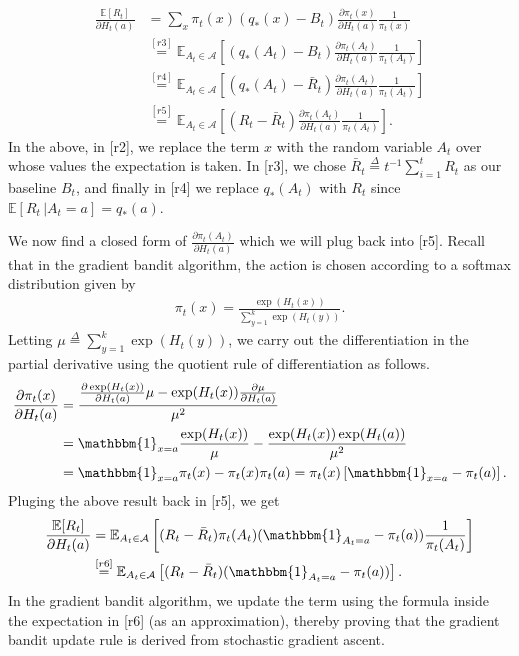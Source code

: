 \documentclass[10pt]{article}
\newcommand{\ldef}{\stackrel{\Delta}{=}}
\begin{document}
	\begin{align*}
	\frac{\mathbb{E}[R_t]}{\partial H_t(a)} &= \sum_{x} \pi_t(x) (q_{*}(x) - B_t) \frac{\partial \pi_t(x)}{\partial H_t(a)}\frac{1}{\pi_t(x)}\\
	& \stackrel{[r3]}{=} \mathbb{E}_{A_t\in\mathcal{A}}\left[ (q_{*}(A_t) - B_t) \frac{\partial \pi_t(A_t)}{\partial H_t(a)}\frac{1}{\pi_t(A_t)} \right]\\
	& \stackrel{[r4]}{=} \mathbb{E}_{A_t\in\mathcal{A}}\left[ (q_{*}(A_t) - \bar{R}_t) \frac{\partial \pi_t(A_t)}{\partial H_t(a)}\frac{1}{\pi_t(A_t)} \right]\\
	& \stackrel{[r5]}{=} \mathbb{E}_{A_t\in\mathcal{A}}\left[ (R_t - \bar{R}_t) \frac{\partial \pi_t(A_t)}{\partial H_t(a)}\frac{1}{\pi_t(A_t)} \right].
	\end{align*}
	In the above, in [r2], we replace the term $x$ with the random variable $A_t$ over whose values the expectation is taken. In [r3], we chose $\bar{R}_t \ldef t^{-1}\sum_{i=1}^t R_t$ as our baseline $B_t$, and finally in [r4] we replace $q_{*}(A_t)$ with $R_t$ since $\mathbb{E} [ R_t \, \vert A_t = a] = q_{*}(a)$.\par\noindent
	We now find a closed form of $\frac{\partial \pi_t(A_t)}{\partial H_t(a)}$ which we will plug back into [r5]. Recall that in the gradient bandit algorithm, the action is chosen according to a softmax distribution given by  
	\begin{align*}
	\pi_t (x) = \frac{ \exp(H_t(x))}{ \sum_{y=1}^k \exp(H_t(y)) }.
	\end{align*}
	Letting $\mu \ldef  \sum_{y=1}^k \exp(H_t(y))$, we carry out the differentiation in the partial derivative using the quotient rule of differentiation as follows.
	\begin{align*}
	\frac{\partial \pi_t(x)}{\partial H_t(a)} &= \frac { \frac{\partial \exp(H_t(x)) }{ \partial H_t(a) }\mu - \exp(H_t(x)) \frac{\partial \mu}{\partial H_t(a)} }{\mu^2}\\
	&= \mathbbm{1}_{x=a}\frac{\exp(H_t(x))}{\mu} - \frac{ \exp(H_t(x)) \exp(H_t(a))}{\mu^2}\\
	&= \mathbbm{1}_{x=a}\pi_t(x) - \pi_t(x)\pi_t(a) = \pi_t(x) \left[ \mathbbm{1}_{x=a} - \pi_t(a) \right].
	\end{align*}
	Pluging the above result back in [r5], we get
	\begin{align*}
	\frac{\mathbb{E}[R_t]}{\partial H_t(a)} &= \mathbb{E}_{A_t\in\mathcal{A}}\left[ (R_t - \bar{R}_t) \pi_t(A_t) (\mathbbm{1}_{A_t=a}-\pi_t(a))\frac{1}{\pi_t(A_t)} \right]\\
	&\stackrel{[r6]}{=} \mathbb{E}_{A_t\in\mathcal{A}}\left[ (R_t - \bar{R}_t) (\mathbbm{1}_{A_t=a}-\pi_t(a)) \right].
	\end{align*}
	In the gradient bandit algorithm, we update the term using the formula inside the expectation in [r6] (as an approximation), thereby proving that the gradient bandit update rule is derived from stochastic gradient ascent.
	\newpage
\end{document}
